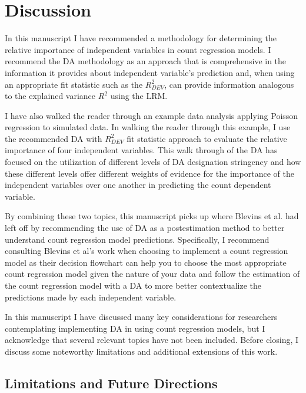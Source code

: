 \documentclass[man]{apa7}
\begin{document}
\section{Discussion}

	In this manuscript I have recommended a methodology for determining the relative importance of independent variables in count regression models.
	I recommend the DA methodology as an approach that is comprehensive in the information it provides about independent variable's prediction and, when using an appropriate fit statistic such as the $R^2_{DEV}$, can provide information analogous to the explained variance $R^2$ using the LRM.
	
	I have also walked the reader through an example data analysis applying Poisson regression to simulated data. 
	In walking the reader through this example, I use the recommended DA with $R^2_{DEV}$ fit statistic approach to evaluate the relative importance of four independent variables.
	This walk through of the DA has focused on the utilization of different levels of DA designation stringency and how these different levels offer different weights of evidence for the importance of the independent variables over one another in predicting the count dependent variable.
	
	By combining these two topics, this manuscript picks up where Blevins et al. \parencite*{blevins2015count} had left off by recommending the use of DA as a postestimation method to better understand count regression model predictions.
	Specifically, I recommend consulting Blevins et al's work when choosing to implement a count regression model as their decision flowchart can help you to choose the most appropriate count regression model given the nature of your data and follow the estimation of the count regression model with a DA to more better contextualize the predictions made by each independent variable.
	
	In this manuscript I have discussed many key considerations for researchers contemplating implementing DA in using count regression models, but I acknowledge that several relevant topics have not been included.
	Before closing, I discuss some noteworthy limitations and additional extensions of this work.
	
	\subsection{Limitations and Future Directions}
	
\end{document}

